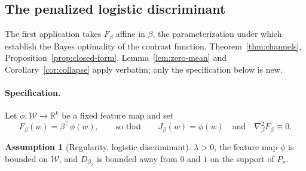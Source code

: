 \documentclass[11pt]{article}
\theoremstyle{plain}
\theoremstyle{definition}
\newtheorem{assumption}{Assumption}
\theoremstyle{remark}
\newcommand{\R}{\mathbb{R}}
\newcommand{\cW}{\ensuremath{\mathcal{W}}}
\newcommand{\ratio}{\ensuremath{\pi}}
\newcommand{\Dfit}{\ensuremath{\mathcal{D}_{\mathrm{fit}}^{T,X,Y}}}
\newcommand{\Deval}{\ensuremath{\mathcal{D}_{\mathrm{eval}}^{T,X,Y}}}
\newcommand{\Dstruct}{\ensuremath{\mathcal{D}_{\mathrm{struct}}^{W,Z}}}
\newcommand{\Dleaf}{\ensuremath{\mathcal{D}_{\mathrm{leaf}}^{W,Z}}}
\newcommand{\ks}{k}
\begin{document}
%

\fi
\subsection{The penalized logistic discriminant}
\label{sec:mcd-logistic}

The first application takes $F_\beta$ affine in $\beta$, the parameterization under which
\citet{meziani2025mcd} establish the Bayes optimality of the contrast function.
Theorem~\ref{thm:channels}, Proposition~\ref{prop:closed-form}, Lemma~\ref{lem:zero-mean} and
Corollary~\ref{cor:collapse} apply verbatim; only the specification below is new.

\paragraph{Specification.}
\label{sec:mcd-logistic-spec}
Let $\phi:\cW\to\R^{\ks}$ be a fixed feature map and set
\begin{equation}
F_\beta(w) = \beta^\top\phi(w),
\qquad\text{so that}\qquad
J_\beta(w) = \phi(w)
\quad\text{and}\quad
\nabla^2_\beta F_\beta \equiv 0 .
\label{eq:logistic-logit}
\end{equation}

\begin{assumption}[Regularity, logistic discriminant]
\label{as:smooth}
$\lambda > 0$, the feature map $\phi$ is bounded on $\cW$, and $D_{\beta_\lambda}$ is bounded
away from $0$ and $1$ on the support of $P_\ratio$.
\end{assumption}
\end{document}
